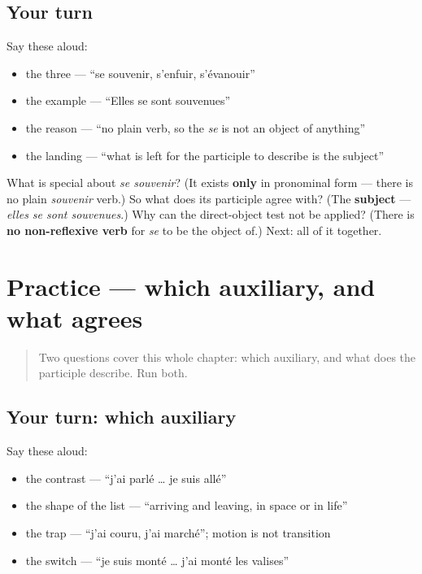 \subsection*{Your turn}
Say these aloud:

\begin{itemize}
\raggedright
  \item the three — \textquotedblleft{}se souvenir, s'enfuir, s'évanouir\textquotedblright{}
  \item the example — \textquotedblleft{}Elles se sont souvenues\textquotedblright{}
  \item the reason — \textquotedblleft{}no plain verb, so the \emph{se} is not an object of anything\textquotedblright{}
  \item the landing — \textquotedblleft{}what is left for the participle to describe is the subject\textquotedblright{}
\end{itemize}

\begin{tcolorbox}[breakable,colback=teal!4,colframe=teal!35!black,title={Before you move on}]
What is special about \emph{se souvenir}? (It exists \textbf{only} in pronominal form — there is no plain \emph{souvenir} verb.) So what does its participle agree with? (The \textbf{subject} — \emph{elles se sont souvenues}.) Why can the direct-object test not be applied? (There is \textbf{no non-reflexive verb} for \emph{se} to be the object of.) Next: all of it together.
\end{tcolorbox}
\section[Practice]{Practice — which auxiliary, and what agrees}

\label{lesson:FR-C16-practice-etre-past}



\begin{quote}
Two questions cover this whole chapter: which auxiliary, and what does the participle describe. Run both.
\end{quote}

\subsection*{Your turn: which auxiliary}
Say these aloud:

\begin{itemize}
\raggedright
  \item the contrast — \textquotedblleft{}j'ai parlé … je suis allé\textquotedblright{}
  \item the shape of the list — \textquotedblleft{}arriving and leaving, in space or in life\textquotedblright{}
  \item the trap — \textquotedblleft{}j'ai couru, j'ai marché\textquotedblright{}; motion is not transition
  \item the switch — \textquotedblleft{}je suis monté … j'ai monté les valises\textquotedblright{}
\end{itemize}

